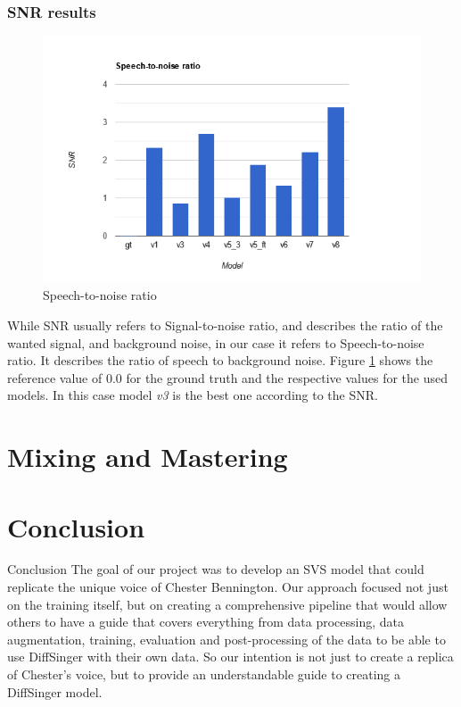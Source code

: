 \documentclass[a4paper]{article}
\begin{document}
	\subsubsection{SNR results}
	\begin{figure}[hbtp]
		\includegraphics[width=\textwidth]{evaluation/graphs/SNR.png}
		\caption{Speech-to-noise ratio}
		\label{fig:snr}
	\end{figure}
	
	While SNR usually refers to Signal-to-noise ratio, and describes the ratio of
	the wanted signal, and background noise, in our case it refers to
	Speech-to-noise ratio. It describes the ratio of speech to background noise.
	Figure \ref{fig:snr} shows the reference value of 0.0 for the ground truth and
	the respective values for the used models. In this case model \emph{v3} is the
	best one according to the SNR.
	
	\section{Mixing and Mastering}
	
	
	
	\section{Conclusion}
	
	Conclusion
	The goal of our project was to develop an SVS model that could replicate the unique voice of Chester Bennington. Our approach focused not just on the training itself, but on creating a comprehensive pipeline that would allow others to have a guide that covers everything from data processing, data augmentation, training, evaluation and post-processing of the data to be able to use DiffSinger with their own data. So our intention is not just to create a replica of Chester's voice, but to provide an understandable guide to creating a DiffSinger model.
	
\end{document}
